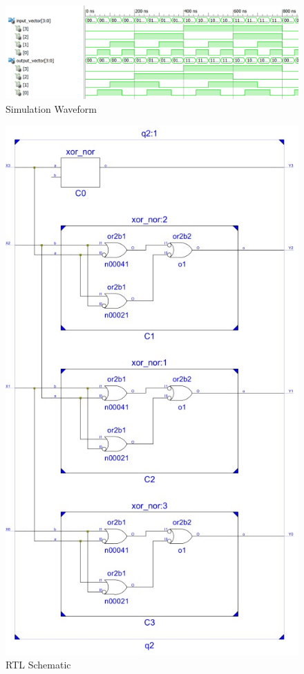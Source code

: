 \documentclass{article}
\begin{document}
\begin{figure}[H]
    \centering
    \includegraphics[scale=0.55,cframe=blue 0.5pt 3pt]{2w.jpg}
    \caption{Simulation Waveform }
\end{figure}


\begin{figure}[H]
    \centering
    \includegraphics[scale=1.3,cframe=blue 0.5pt 3pt]{2s.jpg}
    \caption{RTL Schematic }
\end{figure}
\end{document}
